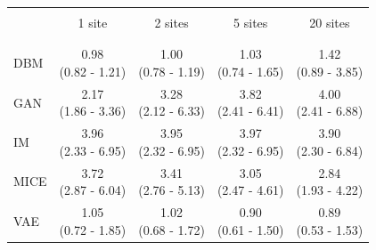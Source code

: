 \documentclass[12pt]{article}
\begin{document}
\begin{minipage}{\linewidth}
\captionsetup{type=table}
\label{tab:distgenresults_rmse}
\begin{tabular}{l|cccc}
\\\\[-4\medskipamount]
& 1 site & 2 sites & 5 sites & 20 sites \\[0.5ex]
\hline
\\\\[-4\medskipamount]
DBM & \makecell{0.98 \\ (0.82 - 1.21)} & \makecell{1.00 \\ (0.78 - 1.19)} & \makecell{1.03 \\ (0.74 - 1.65)} & \makecell{1.42 \\ (0.89 - 3.85)} \\[2ex]
GAN & \makecell{2.17 \\ (1.86 - 3.36)} & \makecell{3.28 \\ (2.12 - 6.33)} & \makecell{3.82 \\ (2.41 - 6.41)} & \makecell{4.00 \\ (2.41 - 6.88)} \\[2ex]
IM & \makecell{3.96 \\ (2.33 - 6.95)} & \makecell{3.95 \\ (2.32 - 6.95)} & \makecell{3.97 \\ (2.32 - 6.95)} & \makecell{3.90 \\ (2.30 - 6.84)} \\[2ex]
MICE & \makecell{3.72 \\ (2.87 - 6.04)} & \makecell{3.41 \\ (2.76 - 5.13)} & \makecell{3.05 \\ (2.47 - 4.61)} & \makecell{2.84 \\ (1.93 - 4.22)} \\[2ex]
VAE & \makecell{1.05 \\ (0.72 - 1.85)} & \makecell{1.02 \\ (0.68 - 1.72)} & \makecell{0.90 \\ (0.61 - 1.50)} & \makecell{0.89 \\ (0.53 - 1.53)} \\[2ex]
\end{tabular}
\end{minipage}
\end{document}
